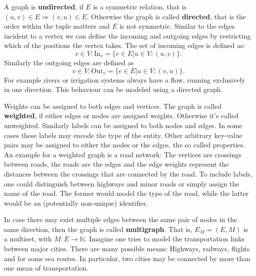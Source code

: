             A graph is \textbf{undirected}, if $E$ is a symmetric relation, that is $(u, v) \in E \Rightarrow (v, u) \in E$. 
            Otherwise the graph is called \textbf{directed}, that is the order within the tuple matters and $E$ is not symmetric.             
            Similar to the edges incident to a vertex we can define the incoming and outgoing edges by restricting which of the positions the vertex takes. 
            The set of incoming edges is defined as:
            \[v \in V: \text{In}_v = \{e \in E |u \in V: (u, v) \}.\]
            Similarly the outgoing edges are defined as 
            \[v \in V: \text{Out}_v = \{e \in E |u \in V: (v, u) \}.
            \]
            For example rivers or irrigation systems always have a flow, running exclusively in one direction. 
            This behaviour can be modeled using a directed graph.
            
            Weights can be assigned to both edges and vertices. The graph is called \textbf{weighted}, if either edges or nodes are assigned weights.
            Otherwise it's called unweighted.
            Similarly labels can be assigned to both nodes and edges. 
            In some cases these labels may encode the type of the entity.
            Other arbitrary key-value pairs may be assigned to either the nodes or the edges, the so called properties.           
            An example for a weighted graph is a road network: 
            The vertices are crossings between roads, the roads are the edges and the edge weights represent the distances between the crossings that are connected by the road.
            To include labels, one could distinguish between highways and minor roads or simply assign the name of the road. 
            The former would model the type of the road, while the latter would be an (potentially non-unique) identifier.
            
            In case there may exist multiple edges between the same pair of nodes in the same direction, then the graph is called \textbf{multigraph}. 
            That is, $E_M = (E, M)$ is a multiset, with $M: E \rightarrow \mathbb{N}$. 
            Imagine one tries to model the transportation links between major cities. 
            There are many possible means: Highways, railways, flights and for some sea routes. 
            In particular, two cities may be connected by more than one mean of transportation.
            
